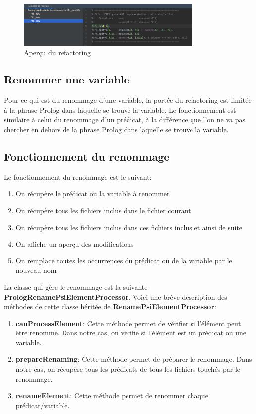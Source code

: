 \begin{figure}[H]
    \centering
    \includegraphics[width=0.8\textwidth]{images/Refactoring_preview.png}
    \caption{Aperçu du refactoring}
    \label{fig:refactor_preview}
\end{figure}

\subsection{Renommer une variable}
\noindent Pour ce qui est du renommage d'une variable, la portée du refactoring est limitée à la phrase Prolog dans laquelle se trouve la variable.
\newdoubleline
Le fonctionnement est similaire à celui du renommage d'un prédicat, à la différence que l'on ne va pas chercher en dehors de la phrase Prolog dans laquelle se trouve la variable.

\subsection{Fonctionnement du renommage}
\noindent Le fonctionnement du renommage est le suivant:
\begin{enumerate}
    \item On récupère le prédicat ou la variable à renommer
    \item On récupère tous les fichiers inclus dans le fichier courant
    \item On récupère tous les fichiers inclus dans ces fichiers inclus et ainsi de suite
    \item On affiche un aperçu des modifications
    \item On remplace toutes les occurrences du prédicat ou de la variable par le nouveau nom
\end{enumerate}

\noindent La classe qui gère le renommage est la suivante \textbf{PrologRenamePsiElementProcessor}.
Voici une brève description des méthodes de cette classe héritée de \textbf{RenamePsiElementProcessor}:
\begin{enumerate}
    \item \textbf{canProcessElement}: Cette méthode permet de vérifier si l'élément peut être renommé. Dans notre cas, on vérifie si l'élément est un prédicat ou une variable.
    \item \textbf{prepareRenaming}: Cette méthode permet de préparer le renommage. Dans notre cas, on récupère tous les prédicats de tous les fichiers touchés par le renommage.
    \item \textbf{renameElement}: Cette méthode permet de renommer chaque prédicat/variable.
\end{enumerate}